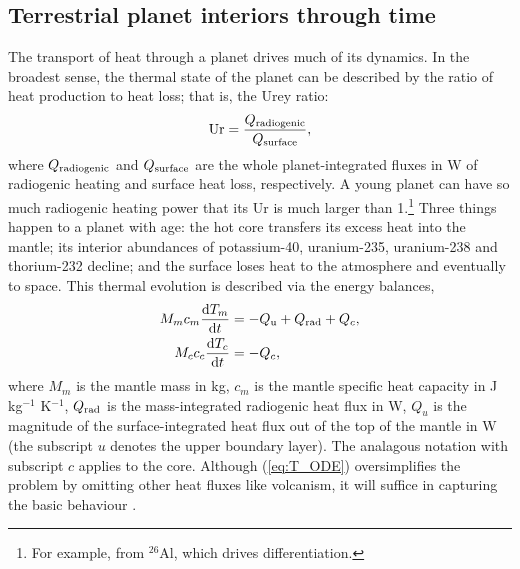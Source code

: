 \subsection{Terrestrial planet interiors through time}


The transport of heat through a planet drives much of its dynamics. In the broadest sense, the thermal state of the planet can be described by the ratio of heat production to heat loss; that is, the Urey ratio:
\begin{align}\label{eq:Ur}
{\rm Ur} = \frac{Q_{\rm radiogenic}}{Q_{\rm surface}},
\end{align}
where $Q_{\rm radiogenic}$ and $Q_{\rm surface}$ are the whole planet-integrated fluxes in W of radiogenic heating and surface heat loss, respectively. A young planet can have so much radiogenic heating power that its Ur is much larger than 1.\footnote{For example, from $^{26}$Al, which drives differentiation.} Three things happen to a planet with age: the hot core transfers its excess heat into the mantle; its interior abundances of potassium-40, uranium-235, uranium-238 and thorium-232 decline; and the surface loses heat to the atmosphere and eventually to space. This thermal evolution is described via the energy balances,
\begin{align}\label{eq:T_ODE}
\begin{split}
M_m c_{m} \frac{{\rm d}T_m}{{\rm d}t} &= -Q_{\rm u} + Q_{\rm rad} + Q_c, \\
M_c c_{c} \frac{{\rm d}T_c}{{\rm d}t} &= -Q_c,
\end{split}
\end{align}
where $M_m$ is the mantle mass in kg, $c_{m}$ is the mantle specific heat capacity in J kg$^{-1}$ K$^{-1}$, $Q_{\rm rad}$ is the mass-integrated radiogenic heat flux in W, $Q_{u}$ is the magnitude of the surface-integrated heat flux out of the top of the mantle in W (the subscript $u$ denotes the upper boundary layer). The analagous notation with subscript $c$ applies to the core. Although (\ref{eq:T_ODE}) oversimplifies the problem by omitting other heat fluxes like volcanism, it will suffice in capturing the basic behaviour \citep{Jaupart2015}.



